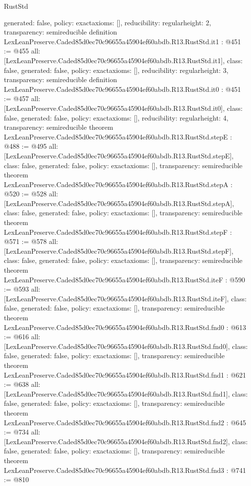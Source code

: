 \begin{lexlean}{RustStd}
\begin{coremodule}
{  generated: false,
  policy: exact{axioms: []},
  reducibility: regular{height: 2},
  transparency: semireducible
}
definition LexLeanPreserve.Caded85d0ec70c96655a45904ef60abdb.R13.RustStd.it1 : @451 := @455 {
  all: [LexLeanPreserve.Caded85d0ec70c96655a45904ef60abdb.R13.RustStd.it1],
  class: false,
  generated: false,
  policy: exact{axioms: []},
  reducibility: regular{height: 3},
  transparency: semireducible
}
definition LexLeanPreserve.Caded85d0ec70c96655a45904ef60abdb.R13.RustStd.it0 : @451 := @457 {
  all: [LexLeanPreserve.Caded85d0ec70c96655a45904ef60abdb.R13.RustStd.it0],
  class: false,
  generated: false,
  policy: exact{axioms: []},
  reducibility: regular{height: 4},
  transparency: semireducible
}
theorem LexLeanPreserve.Caded85d0ec70c96655a45904ef60abdb.R13.RustStd.stepE : @488 := @495 {
  all: [LexLeanPreserve.Caded85d0ec70c96655a45904ef60abdb.R13.RustStd.stepE],
  class: false,
  generated: false,
  policy: exact{axioms: []},
  transparency: semireducible
}
theorem LexLeanPreserve.Caded85d0ec70c96655a45904ef60abdb.R13.RustStd.stepA : @520 := @528 {
  all: [LexLeanPreserve.Caded85d0ec70c96655a45904ef60abdb.R13.RustStd.stepA],
  class: false,
  generated: false,
  policy: exact{axioms: []},
  transparency: semireducible
}
theorem LexLeanPreserve.Caded85d0ec70c96655a45904ef60abdb.R13.RustStd.stepF : @571 := @578 {
  all: [LexLeanPreserve.Caded85d0ec70c96655a45904ef60abdb.R13.RustStd.stepF],
  class: false,
  generated: false,
  policy: exact{axioms: []},
  transparency: semireducible
}
theorem LexLeanPreserve.Caded85d0ec70c96655a45904ef60abdb.R13.RustStd.iteF : @590 := @593 {
  all: [LexLeanPreserve.Caded85d0ec70c96655a45904ef60abdb.R13.RustStd.iteF],
  class: false,
  generated: false,
  policy: exact{axioms: []},
  transparency: semireducible
}
theorem LexLeanPreserve.Caded85d0ec70c96655a45904ef60abdb.R13.RustStd.fnd0 : @613 := @616 {
  all: [LexLeanPreserve.Caded85d0ec70c96655a45904ef60abdb.R13.RustStd.fnd0],
  class: false,
  generated: false,
  policy: exact{axioms: []},
  transparency: semireducible
}
theorem LexLeanPreserve.Caded85d0ec70c96655a45904ef60abdb.R13.RustStd.fnd1 : @621 := @638 {
  all: [LexLeanPreserve.Caded85d0ec70c96655a45904ef60abdb.R13.RustStd.fnd1],
  class: false,
  generated: false,
  policy: exact{axioms: []},
  transparency: semireducible
}
theorem LexLeanPreserve.Caded85d0ec70c96655a45904ef60abdb.R13.RustStd.fnd2 : @645 := @734 {
  all: [LexLeanPreserve.Caded85d0ec70c96655a45904ef60abdb.R13.RustStd.fnd2],
  class: false,
  generated: false,
  policy: exact{axioms: []},
  transparency: semireducible
}
theorem LexLeanPreserve.Caded85d0ec70c96655a45904ef60abdb.R13.RustStd.fnd3 : @741 := @810 {
}
\end{coremodule}
\end{lexlean}
